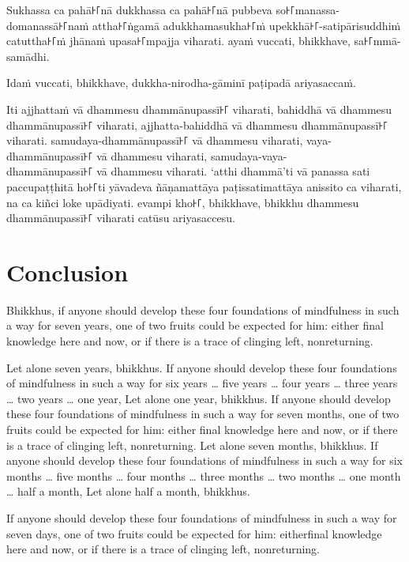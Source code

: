 Sukhassa ca pahā꜔꜒nā dukkhassa ca pahā꜔꜒nā pubbeva so꜔꜒manassa-domanassā꜔꜒naṁ attha꜔꜒ṅgamā
adukkhamasukha꜔꜒ṁ upekkhā꜔꜒-satipārisuddhiṁ catuttha꜔꜒ṁ jhānaṁ upasa꜔꜒mpajja viharati.
ayaṁ vuccati, bhikkhave, sa꜔꜒mmā-samādhi.

Idaṁ vuccati, bhikkhave, dukkha-nirodha-gāminī paṭipadā ariyasaccaṁ.

Iti ajjhattaṁ vā dhammesu dhammānupassī꜔꜒ viharati,
bahiddhā vā dhammesu dhammānupassī꜔꜒ viharati,
ajjhatta-bahiddhā vā dhammesu dhammānupassī꜔꜒ viharati.
samudaya-dhammānupassī꜔꜒ vā dhammesu viharati,
vaya-dhammānupassī꜔꜒ vā dhammesu viharati,
samudaya-vaya-\\ dhammānupassī꜔꜒ vā dhammesu viharati.
‘atthi dhammā’ti vā panassa sati paccupaṭṭhitā ho꜔꜒ti
yāvadeva ñāṇamattāya paṭissatimattāya anissito ca viharati,
na ca kiñci loke upādiyati. evampi kho꜔꜒, bhikkhave, bhikkhu
dhammesu dhammānupassī꜔꜒ viharati catūsu ariyasaccesu.



\englishPage
\chapter{Conclusion}

Bhikkhus, if anyone should develop these four foundations of mindfulness in
such a way for seven years, one of two fruits could be expected for him: either
final knowledge here and now, or if there is a trace of clinging left,
nonreturning.

Let alone seven years, bhikkhus. If anyone should develop these four
foundations of mindfulness in such a way for six years \ldots{} five years
\ldots{} four years \ldots{} three years \ldots{} two years \ldots{} one year,
Let alone one year, bhikkhus. If anyone should develop these four foundations
of mindfulness in such a way for seven months, one of two fruits could be
expected for him: either final knowledge here and now, or if there is a trace of
clinging left, nonreturning. Let alone seven months, bhikkhus. If anyone should
develop these four foundations of mindfulness in such a way for six months
\ldots{} five months \ldots{} four months \ldots{} three months \ldots{} two
months \ldots{} one month \ldots{} half a month, Let alone half a month,
bhikkhus.

If anyone should develop these four foundations of mindfulness in such a way
for seven days, one of two fruits could be expected for him: eitherfinal
knowledge here and now, or if there is a trace of clinging left, nonreturning.

